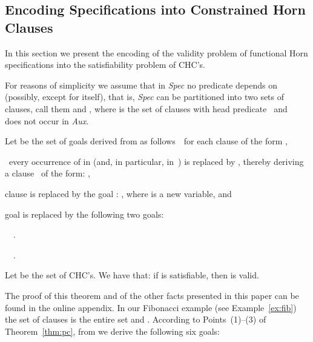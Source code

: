 \documentclass[english]{tlp}
\newcommand{\eop}{\hfill}
\begin{document}
\subsection{Encoding Specifications into Constrained Horn Clauses}
\label{subsec:PC}

In this section we present the encoding of the 
validity problem of functional Horn specifications into the satisfiability 
problem of CHC's.
 
For reasons of simplicity we assume that in \textit{Spec} 
no predicate depends on  (possibly, except for  itself),
that is,  \textit{Spec} can be partitioned into two sets of clauses,
call them 
and , where 
is the set of clauses with head predicate~ and~ does not occur in \textit{Aux}. 

\vspace{-2mm}



\begin{theorem}\label{thm:pc}
Let  be the set of goals derived from 
 as follows\ \ 
for each clause  of the form 
,

\noindent
\hangindent=5.5mm
~every occurrence of  in  
(and, in particular, in~) is replaced by , 
thereby deriving a clause~ of the form\/: 
, 

\noindent
\hangindent=5.5mm
 clause  is replaced by the goal : 
, where  is a new variable, and



\noindent
\hangindent=0mm
  goal  is replaced by the following two goals:



~~.~ 

~~.~ 





\hangindent=0mm
\noindent
Let  be the set 
 of CHC's.
We have that: if  is satisfiable,
then \mbox{} 
is valid.\eop
\end{theorem}

\vspace{-1mm}
\noindent
The proof of this theorem and of the other facts presented in this
paper can be found in the online appendix.
In our Fibonacci example  (see Example~\ref{ex:fib})
 the set   of clauses 
is the entire set  
and . 
According to Points~(1)--(3) of Theorem~\ref{thm:pc},
from  we derive the following six 
goals: 
\end{document}
